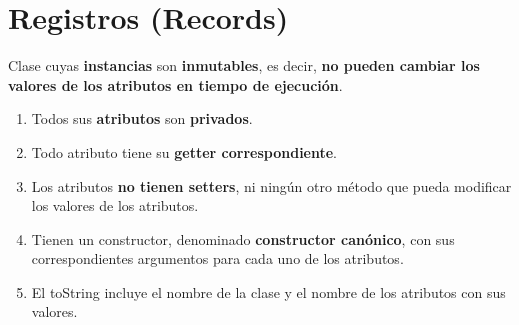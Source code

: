 \documentclass{article}
\begin{document}
\newpage

\section{Registros (Records)}
Clase cuyas \textbf{instancias} son \textbf{inmutables}, es decir, \textbf{no pueden cambiar los valores de los atributos en tiempo de ejecución}. 
\begin{enumerate}
    \item Todos sus \textbf{atributos} son \textbf{privados}.
    \item Todo atributo tiene su \textbf{getter correspondiente}.
    \item Los atributos \textbf{no tienen setters}, ni ningún otro método que pueda modificar los valores de los atributos.
    \item Tienen un constructor, denominado \textbf{constructor canónico}, con sus correspondientes argumentos para cada uno de los atributos.
    \item El toString incluye el nombre de la clase y el nombre de los atributos con sus valores.
\end{enumerate}



\begin{comment}
\begin{figure}[h]
    \centering
    \texttt{[image: 1.png]}
    \caption{}
\end{figure}
\end{comment}

\begin{comment}
\begin{wrapfigure}[]{r}{0.5\linewidth}
    \centering
    \texttt{[image: 8.png]}
    \caption{}
\end{wrapfigure}
\end{comment}
\end{document}
